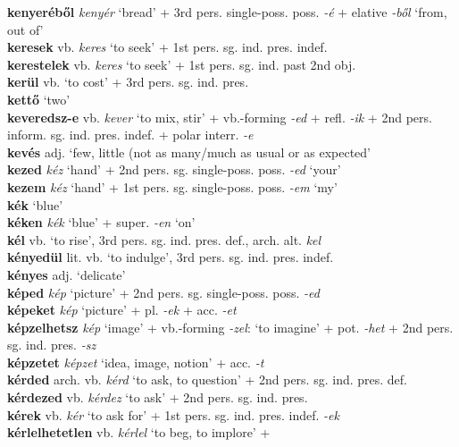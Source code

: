 \documentclass[11pt]{article}
\begin{document}
\textbf{kenyeréből} \emph{kenyér} `bread' + 3rd
pers. single\hyp{}poss. poss. \emph{-é} + elative \emph{-ből} `from, out of' \\
\textbf{keresek} vb. \emph{keres} `to seek' + 1st
pers. sg. ind. pres. indef. \\
\textbf{kerestelek} vb. \emph{keres} `to seek' + 1st
pers. sg. ind. past 2nd obj. \\
\textbf{kerül} vb. `to cost' + 3rd pers. sg. ind. pres. \\
\textbf{kettő} `two' \\
\textbf{keveredsz-e} vb. \emph{kever} `to mix, stir' +
vb.\hyp{}forming \emph{-ed}
+ refl. \emph{-ik} + 2nd pers. inform. sg. ind. pres. indef. + polar
interr. \emph{-e} \\
\textbf{kevés} adj. `few, little (not as many/much as usual or as expected' \\
\textbf{kezed} \emph{kéz} `hand' + 2nd
pers. sg. single\hyp{}poss. poss. \emph{-ed} `your' \\
\textbf{kezem} \emph{kéz} `hand' + 1st
pers. sg. single\hyp{}poss. poss. \emph{-em} `my' \\
\textbf{kék} `blue' \\
\textbf{kéken} \emph{kék} `blue' +
super. \emph{-en} `on' \\
\textbf{kél} vb. `to rise', 3rd pers. sg. ind. pres. def.,
  arch. alt. \emph{kel} \\
\textbf{kényedül} lit. vb. `to indulge', 3rd
pers. sg. ind. pres. indef. \\
\textbf{kényes} adj. `delicate' \\
\textbf{képed} \emph{kép} `picture' + 2nd
pers. sg. single\hyp{}poss. poss. \emph{-ed} \\
\textbf{képeket} \emph{kép} `picture' + pl. \emph{-ek} + acc. \emph{-et} \\
\textbf{képzelhetsz} \emph{kép} `image' + vb.-forming \emph{-zel}:
`to imagine' + pot. \emph{-het} + 2nd
pers. sg. ind. pres. \emph{-sz} \\
\textbf{képzetet} \emph{képzet} `idea, image, notion' +
acc. \emph{-t} \\
\textbf{kérded} arch. vb. \emph{kérd} `to ask, to question' + 2nd
pers. sg. ind. pres. def. \\
\textbf{kérdezed} vb. \emph{kérdez} `to ask' + 2nd
pers. sg. ind. pres. \\
\textbf{kérek} vb. \emph{kér} `to ask for' + 1st
pers. sg. ind. pres. indef. \emph{-ek} \\
\textbf{kérlelhetetlen} vb. \emph{kérlel} `to beg, to implore' +
\end{document}

